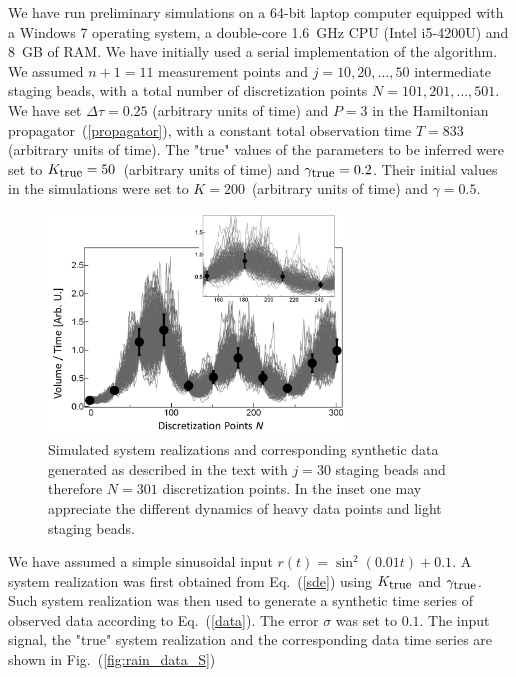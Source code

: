 \documentclass[12pt,a4paper,final]{iopart}
\begin{document}
We have run preliminary simulations on a 64-bit laptop computer equipped with a Windows 7 operating system, a double-core 1.6~GHz CPU (Intel i5-4200U) and 8~GB of RAM. We have initially used a serial implementation of the algorithm. We assumed $n+1 = 11$ measurement points and $j = 10, 20,\dots, 50$ intermediate staging beads, with a total number of discretization points $N = 101, 201, \dots, 501$. We have set $\Delta\tau = 0.25$ (arbitrary units of time) and $P = 3$ in the Hamiltonian propagator~(\ref{propagator}), with a constant total observation time $T = 833$ (arbitrary units of time). The "true" values of the parameters to be inferred were set to $K_{\mbox{\small true}}=50$~(arbitrary units of time) and $\gamma_{\mbox{\small true}} = 0.2$. Their initial values in the simulations were set to $K=200$~(arbitrary units of time) and $\gamma = 0.5$.
%
\begin{figure}[htb!]
    \centering
    \includegraphics[width=0.7\textwidth]{Figs/FigSpaghetti.png}
    \caption{Simulated system realizations and corresponding synthetic data generated as described in the text with $j=30$ staging beads and therefore $N=301$ discretization points. In the inset one may appreciate the different dynamics of heavy data points and light staging beads.}
    \label{fig:spaghetti}
\end{figure}

We have assumed a simple sinusoidal input $r(t) = \sin^2 \left( 0.01 t \right) + 0.1$. A system realization was first obtained from Eq.~(\ref{sde}) using $K_{\mbox{\small true}}$ and $\gamma_{\mbox{\small true}}$. Such system realization was then used to generate a synthetic time series of observed data according to Eq.~(\ref{data}). The error $\sigma$ was set to $0.1$. The input signal, the "true" system realization and the corresponding data time series are shown in Fig.~(\ref{fig:rain_data_S})
\end{document}
